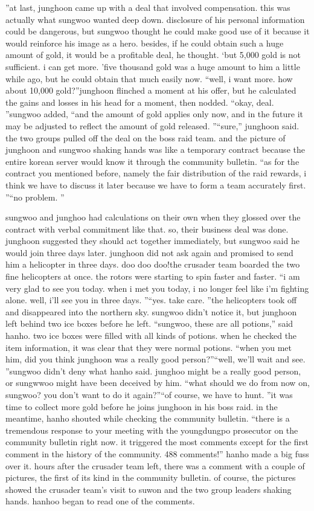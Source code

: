 ”at last, junghoon came up with a deal that involved compensation.
this was actually what sungwoo wanted deep down.
disclosure of his personal information could be dangerous, but sungwoo thought he could make good use of it because it would reinforce his image as a hero.
besides, if he could obtain such a huge amount of gold, it would be a profitable deal, he thought.
‘but 5,000 gold is not sufficient.
 i can get more.
’five thousand gold was a huge amount to him a little while ago, but he could obtain that much easily now.
“well, i want more.
 how about 10,000 gold?”junghoon flinched a moment at his offer, but he calculated the gains and losses in his head for a moment, then nodded.
 “okay, deal.
”sungwoo added, “and the amount of gold applies only now, and in the future it may be adjusted to reflect the amount of gold released.
”“sure,” junghoon said.
the two groups pulled off the deal on the boss raid team.
 and the picture of junghoon and sungwoo shaking hands was like a temporary contract because the entire korean server would know it through the community bulletin.
“as for the contract you mentioned before, namely the fair distribution of the raid rewards, i think we have to discuss it later because we have to form a team accurately first.
”“no problem.
”

sungwoo and junghoo had calculations on their own when they glossed over the contract with verbal commitment like that.
so, their business deal was done.
junghoon suggested they should act together immediately, but sungwoo said he would join three days later.
 junghoon did not ask again and promised to send him a helicopter in three days.
doo doo doo!the crusader team boarded the two fine helicopters at once.
 the rotors were starting to spin faster and faster.
“i am very glad to see you today.
 when i met you today, i no longer feel like i’m fighting alone.
 well, i’ll see you in three days.
”“yes.
 take care.
”the helicopters took off and disappeared into the northern sky.
 sungwoo didn’t notice it, but junghoon left behind two ice boxes before he left.
“sungwoo, these are all potions,” said hanho.
two ice boxes were filled with all kinds of potions.
 when he checked the item information, it was clear that they were normal potions.
“when you met him, did you think junghoon was a really good person?”“well, we’ll wait and see.
”sungwoo didn’t deny what hanho said.
 junghoo might be a really good person, or sungwwoo might have been deceived by him.
“what should we do from now on, sungwoo? you don’t want to do it again?”“of course, we have to hunt.
”it was time to collect more gold before he joins junghoon in his boss raid.
in the meantime, hanho shouted while checking the community bulletin.
“there is a tremendous response to your meeting with the youngdungpo prosecutor on the community bulletin right now.
 it triggered the most comments except for the first comment in the history of the community.
 488 comments!” hanho made a big fuss over it.
hours after the crusader team left, there was a comment with a couple of pictures, the first of its kind in the community bulletin.
of course, the pictures showed the crusader team’s visit to suwon and the two group leaders shaking hands.
hanhoo began to read one of the comments.


 